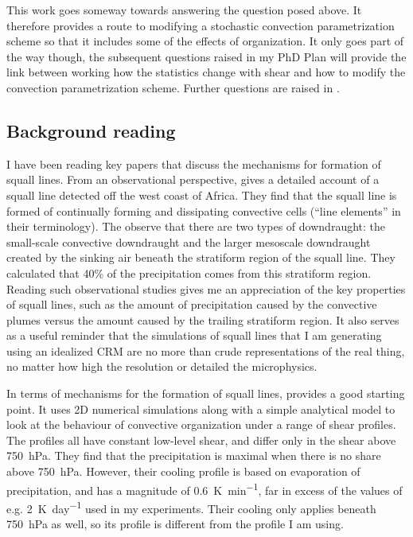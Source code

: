 \documentclass[11pt,a4paper]{article}
\begin{document}
This work goes someway towards answering the question posed above. It therefore provides a route to modifying a stochastic convection parametrization scheme so that it includes some of the effects of organization. It only goes part of the way though, the subsequent questions raised in my PhD Plan will provide the link between working how the statistics change with shear and how to modify the convection parametrization scheme. Further questions are raised in \cite{muetz2017effects}. 

\subsection{Background reading}

I have been reading key papers that discuss the mechanisms for formation of squall lines. From an observational perspective, \cite{houze1977structure} gives a detailed account of a squall line detected off the west coast of Africa. They find that the squall line is formed of continually forming and dissipating convective cells (``line elements'' in their terminology). The observe that there are two types of downdraught: the small-scale convective downdraught and the larger mesoscale downdraught created by the sinking air beneath the stratiform region of the squall line. They calculated that 40\% of the precipitation comes from this stratiform region. Reading such observational studies gives me an appreciation of the key properties of squall lines, such as the amount of precipitation caused by the convective plumes versus the amount caused by the trailing stratiform region. It also serves as a useful reminder that the simulations of squall lines that I am generating using an idealized CRM are no more than crude representations of the real thing, no matter how high the resolution or detailed the microphysics.

In terms of mechanisms for the formation of squall lines, \cite{TMM1982} provides a good starting point. It uses 2D numerical simulations along with a simple analytical model to look at the behaviour of convective organization under a range of shear profiles. The profiles all have constant low-level shear, and differ only in the shear above \SI{750}{hPa}. They find that the precipitation is maximal when there is no share above \SI{750}{hPa}. However, their cooling profile is based on evaporation of precipitation, and has a magnitude of \SI{0.6}{K.min^{-1}}, far in excess of the values of e.g. \SI{2}{K.day^{-1}} used in my experiments. Their cooling only applies beneath \SI{750}{hPa} as well, so its profile is different from the profile I am using.
\end{document}
